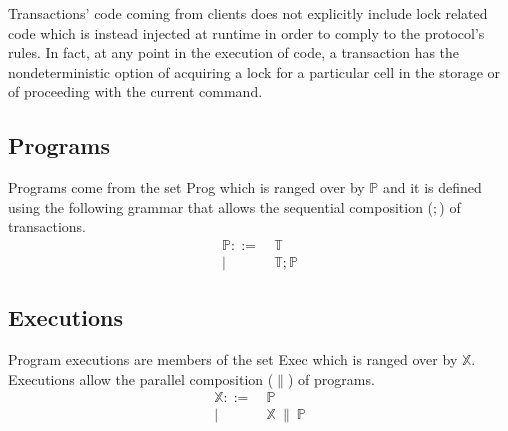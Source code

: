 Transactions' code coming from clients does not explicitly include lock related code which is instead injected at runtime in order to comply to the protocol's rules. In fact, at any point in the execution of code, a transaction has the nondeterministic option of acquiring a lock for a particular cell in the storage or of proceeding with the current command.

\subsection{Programs}

Programs come from the set \textsf{Prog} which is ranged over by $\mathds{P}$ and it is defined using the following grammar that allows the sequential composition ($;$) of transactions.
\begin{align*}
\mathds{P} ::=&
\ \mathds{T} \\
|&\ \mathds{T}; \mathds{P}
\end{align*}

\subsection{Executions}

Program executions are members of the set \textsf{Exec} which is ranged over by $\mathds{X}$. Executions allow the parallel composition ($\|$) of programs.
\begin{align*}
\mathds{X} ::=&
\ \mathds{P} \\
|&\ \mathds{X}\ \|\ \mathds{P} \\
\end{align*}